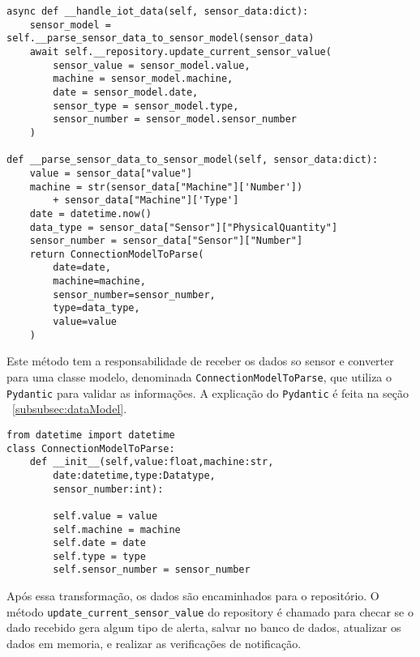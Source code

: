 \begin{verbatim}
async def __handle_iot_data(self, sensor_data:dict):
    sensor_model = self.__parse_sensor_data_to_sensor_model(sensor_data)
    await self.__repository.update_current_sensor_value(
        sensor_value = sensor_model.value,
        machine = sensor_model.machine,
        date = sensor_model.date,
        sensor_type = sensor_model.type,
        sensor_number = sensor_model.sensor_number
    )

def __parse_sensor_data_to_sensor_model(self, sensor_data:dict):
    value = sensor_data["value"]
    machine = str(sensor_data["Machine"]['Number']) 
        + sensor_data["Machine"]['Type']
    date = datetime.now()
    data_type = sensor_data["Sensor"]["PhysicalQuantity"]
    sensor_number = sensor_data["Sensor"]["Number"]
    return ConnectionModelToParse(
        date=date,
        machine=machine,
        sensor_number=sensor_number,
        type=data_type,
        value=value
    )
\end{verbatim}

Este método tem a responsabilidade de receber os dados so sensor e converter para uma classe modelo, denominada \texttt{ConnectionModelToParse}, que utiliza o \texttt{Pydantic} para validar as informações. A explicação do \texttt{Pydantic} é feita na seção ~\ref{subsubsec:dataModel}.

\begin{verbatim}
from datetime import datetime
class ConnectionModelToParse:
    def __init__(self,value:float,machine:str,
        date:datetime,type:Datatype,
        sensor_number:int):

        self.value = value
        self.machine = machine
        self.date = date
        self.type = type
        self.sensor_number = sensor_number
\end{verbatim}

Após essa transformação, os dados são encaminhados para o repositório. O método \texttt{update\_current\_sensor\_value} do repository é chamado para checar se o dado recebido gera algum tipo de alerta, salvar no banco de dados, atualizar os dados em memoria, e realizar as verificações de notificação.

